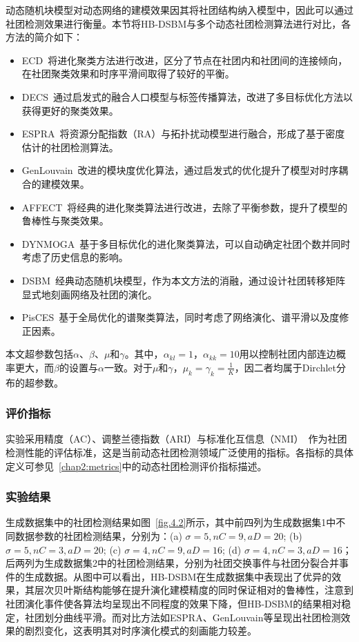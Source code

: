 动态随机块模型对动态网络的建模效果因其将社团结构纳入模型中，因此可以通过社团检测效果进行衡量。本节将HB-DSBM与多个动态社团检测算法进行对比，各方法的简介如下：
\begin{itemize}
	\item ECD~\cite{liu2019evolutionary}将进化聚类方法进行改进，区分了节点在社团内和社团间的连接倾向，在社团聚类效果和时序平滑间取得了较好的平衡。
	\item DECS~\cite{liu2020detecting}通过启发式的融合人口模型与标签传播算法，改进了多目标优化方法以获得更好的聚类效果。
	\item ESPRA~\cite{wang2017dynamic}将资源分配指数（RA）与拓扑扰动模型进行融合，形成了基于密度估计的社团检测算法。
	\item GenLouvain~\cite{jutla2011generalized}改进的模块度优化算法，通过启发式的优化提升了模型对时序耦合的建模效果。
	\item AFFECT~\cite{xu2014adaptive}将经典的进化聚类算法进行改进，去除了平衡参数，提升了模型的鲁棒性与聚类效果。
	\item DYNMOGA~\cite{folino2014evolutionary}基于多目标优化的进化聚类算法，可以自动确定社团个数并同时考虑了历史信息的影响。
	\item DSBM~\cite{yang2011detecting}经典动态随机块模型，作为本文方法的消融，通过设计社团转移矩阵显式地刻画网络及社团的演化。
	\item PisCES~\cite{liu2018global}基于全局优化的谱聚类算法，同时考虑了网络演化、谱平滑以及度修正因素。
\end{itemize}

本文超参数包括$\alpha$、$\beta$、$\mu$和$\gamma$。其中，$\alpha_{kl} = 1$，$\alpha_{kk} = 10$用以控制社团内部连边概率更大，而$\beta$的设置与$\alpha$一致。对于$\mu$和$\gamma$，$\mu_k = \gamma_k = \frac{1}{K}$，因二者均属于Dirchlet分布的超参数。

\subsubsection{评价指标}

实验采用精度（AC）、调整兰德指数（ARI）与标准化互信息（NMI）~\cite{gong2007machine}作为社团检测性能的评估标准，这是当前动态社团检测领域广泛使用的指标。各指标的具体定义可参见~\ref{chap2:metrics}中的动态社团检测评价指标描述。

\subsubsection{实验结果}

生成数据集中的社团检测结果如图~\ref{fig.4.2}所示，其中前四列为生成数据集1中不同数据参数的社团检测结果，分别为：(a) $\sigma =5, nC=9, aD=20$; (b) $\sigma =5, nC=3, aD=20$; (c) $\sigma =4, nC=9, aD=16$; (d) $\sigma =4, nC=3, aD=16$；后两列为生成数据集2中的社团检测结果，分别为社团交换事件与社团分裂合并事件的生成数据。从图中可以看出，HB-DSBM在生成数据集中表现出了优异的效果，其层次贝叶斯结构能够在提升演化建模精度的同时保证相对的鲁棒性，注意到社团演化事件使各算法均呈现出不同程度的效果下降，但HB-DSBM的结果相对稳定，社团划分曲线平滑。而对比方法如ESPRA、GenLouvain等呈现出社团检测效果的剧烈变化，这表明其对时序演化模式的刻画能力较差。



